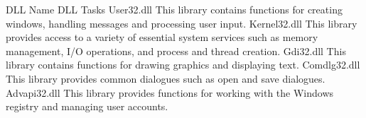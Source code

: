DLL Name	DLL Tasks
User32.dll	This library contains functions for creating windows, handling messages and processing user input.
Kernel32.dll	This library provides access to a variety of essential system services such as memory management, I/O operations, and process and thread creation.
Gdi32.dll	This library contains functions for drawing graphics and displaying text.
Comdlg32.dll	This library provides common dialogues such as open and save dialogues.
Advapi32.dll	This library provides functions for working with the Windows registry and managing user accounts.
